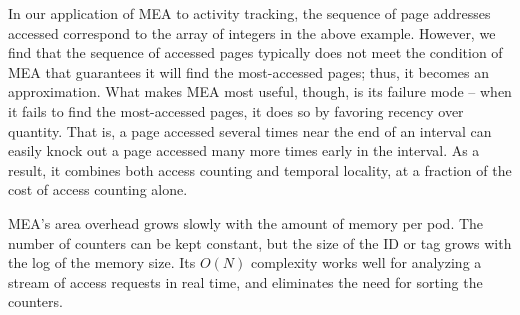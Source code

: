 
In our application of MEA to activity tracking, the sequence of page addresses accessed correspond to the array of integers in the above example. 
However, we find that the sequence of accessed pages typically does not
meet the condition of MEA that guarantees it will find the most-accessed
pages; thus, it becomes an approximation.  What makes MEA most useful,
though, is its failure mode -- when it fails to find the most-accessed pages,
it does so by favoring recency over quantity.  That is, a page accessed several
times near the end of an interval can easily knock out a page accessed many
more times early in the interval.  As a result, it combines both access
counting and temporal locality, at a fraction of the cost of access counting
alone.


MEA's area overhead grows slowly with the amount of memory per pod.  The 
number of counters can be kept constant, but the size of the 
ID or tag grows with the log of the memory size.
Its $O(N)$ complexity works well for analyzing a stream of access requests in real time, and eliminates the need for sorting the counters.

